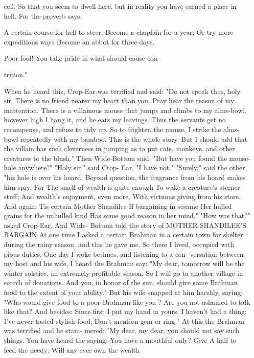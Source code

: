 \documentclass{book}
\begin{document}
cell. So that you seem to dwell here, but in reality
you have earned a place in hell. For the proverb says:

A certain course for hell to steer,
Become a chaplain for a year;
Or try more expeditious ways
Become an abbot for three days.

Poor fool! You take pride in what should cause con-

trition."

When he heard this, Crop-Ear was terrified and
said: "Do not speak thus, holy sir. There is no friend
nearer my heart than you. Pray hear the reason of
my inattention. There is a villainous mouse that
jumps and climbs to my alms-bowl, however high I
hang it, and he eats my leavings. Thus the servants
get no recompense, and refuse to tidy up. So to
frighten the mouse, I strike the alms-bowl repeatedly
with my bamboo. This is the whole story. But I
should add that the villain has such cleverness in
jumping as to put cats, monkeys, and other creatures
to the blush."
Then Wide-Bottom said: "But have you found
the mouse-hole anywhere?" "Holy sir," said Crop-
Ear, "I have not." "Surely," said the other, "his hole
is over his hoard. Beyond question, the fragrance
from his hoard makes him spry. For
The smell of wealth is quite enough
To wake a creature's sterner stuff;
And wealth's enjoyment, even more,
With virtuous giving from his store.
And again:
Tis certain Mother Shandilee
If bargaining in sesame
Her hulled grains for the unhulled kind
Has some good reason in her mind."
"How was that?" asked Crop-Ear. And Wide-
Bottom told the story of
MOTHER SHANDILEE'S BARGAIN
At one time I asked a certain Brahman in a certain
town for shelter during the rainy season, and this he
gave me. So there I lived, occupied with pious duties.
One day I woke betimes, and listening to a con-
versation between my host and his wife, I heard the
Brahman say: "My dear, tomorrow will be the winter
solstice, an extremely profitable season. So I will
go to another village in search of donations. And you,
in honor of the sun, should give some Brahman food
to the extent of your ability."
But his wife snapped at him harshly, saying:
"Who would give food to a poor Brahman like you ?
Are you not ashamed to talk like that? And besides:
Since first I put my hand in yours,
I haven't had a thing:
I've never tasted stylish food;
Don't mention gem or ring."
At this the Brahman was terrified and he stam-
mered: "My dear, my dear, you should not say such
things. You have heard the saying:
You have a mouthful only? Give
A half to feed the needy:
Will any ever own the wealth
\end{document}

